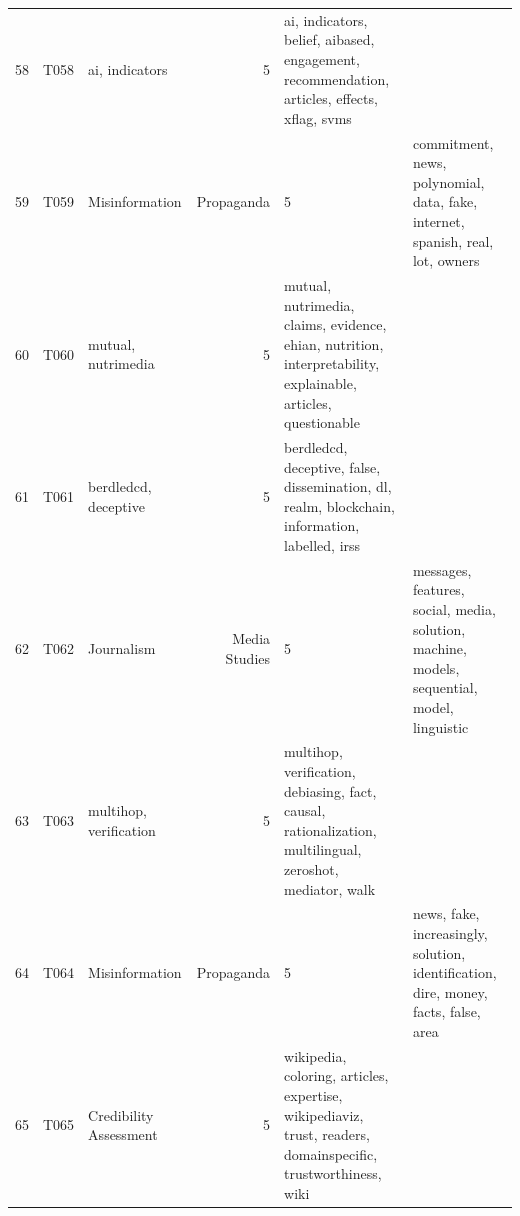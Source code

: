 \begin{tabular}{rllrl}
58 & T058 & ai, indicators & 5 & ai, indicators, belief, aibased, engagement, recommendation, articles, effects, xflag, svms \\
59 & T059 & Misinformation & Propaganda & 5 & commitment, news, polynomial, data, fake, internet, spanish, real, lot, owners \\
60 & T060 & mutual, nutrimedia & 5 & mutual, nutrimedia, claims, evidence, ehian, nutrition, interpretability, explainable, articles, questionable \\
61 & T061 & berdledcd, deceptive & 5 & berdledcd, deceptive, false, dissemination, dl, realm, blockchain, information, labelled, irss \\
62 & T062 & Journalism & Media Studies & 5 & messages, features, social, media, solution, machine, models, sequential, model, linguistic \\
63 & T063 & multihop, verification & 5 & multihop, verification, debiasing, fact, causal, rationalization, multilingual, zeroshot, mediator, walk \\
64 & T064 & Misinformation & Propaganda & 5 & news, fake, increasingly, solution, identification, dire, money, facts, false, area \\
65 & T065 & Credibility Assessment & 5 & wikipedia, coloring, articles, expertise, wikipediaviz, trust, readers, domainspecific, trustworthiness, wiki \\
\bottomrule
\end{tabular}
